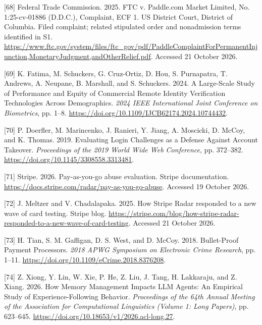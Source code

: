 \documentclass[acmlarge,review,anonymous,nonacm]{acmart}
\newlength{\cslhangindent}
\newlength{\cslentryspacingunit} %
\newenvironment{CSLReferences}[2] %
 {\bibliofont %
  \setlength{\parindent}{0pt}
  \ifodd #1
  \let\oldpar\par
  \def\par{\hangindent=\cslhangindent\oldpar}
  \fi
  \setlength{\parskip}{#2\cslentryspacingunit}
 }%
 {}
\begin{document}
\begin{CSLReferences}{1}{1}
\leavevmode{}%
{[}68{]} Federal Trade Commission. 2025. FTC v. Paddle.com Market
Limited, No. 1:25-cv-01886 (D.D.C.), Complaint, ECF 1. US District
Court, District of Columbia. Filed complaint; related stipulated order
and nonadmission terms identified in S1.
\url{https://www.ftc.gov/system/files/ftc_gov/pdf/PaddleComplaintForPermanentInjunction,MonetaryJudgment,andOtherRelief.pdf}.
Accessed 21 October 2026.

\leavevmode{}%
{[}69{]} K. Fatima, M. Schuckers, G. Cruz-Ortiz, D. Hou, S. Purnapatra,
T. Andrews, A. Neupane, B. Marshall, and S. Schuckers. 2024. A
Large-Scale Study of Performance and Equity of Commercial Remote
Identity Verification Technologies Across Demographics. \emph{2024 IEEE
International Joint Conference on Biometrics}, pp. 1--8.
\url{https://doi.org/10.1109/IJCB62174.2024.10744432}.

\leavevmode{}%
{[}70{]} P. Doerfler, M. Marincenko, J. Ranieri, Y. Jiang, A. Moscicki,
D. McCoy, and K. Thomas. 2019. Evaluating Login Challenges as a Defense
Against Account Takeover. \emph{Proceedings of the 2019 World Wide Web
Conference}, pp. 372--382.
\url{https://doi.org/10.1145/3308558.3313481}.

\leavevmode{}%
{[}71{]} Stripe. 2026. Pay-as-you-go abuse evaluation. Stripe
documentation. \url{https://docs.stripe.com/radar/pay-as-you-go-abuse}.
Accessed 19 October 2026.

\leavevmode{}%
{[}72{]} J. Meltzer and V. Chadalapaka. 2025. How Stripe Radar responded
to a new wave of card testing. Stripe blog.
\url{https://stripe.com/blog/how-stripe-radar-responded-to-a-new-wave-of-card-testing}.
Accessed 21 October 2026.

\leavevmode{}%
{[}73{]} H. Tian, S. M. Gaffigan, D. S. West, and D. McCoy. 2018.
Bullet-Proof Payment Processors. \emph{2018 APWG Symposium on Electronic
Crime Research}, pp. 1--11.
\url{https://doi.org/10.1109/eCrime.2018.8376208}.

\leavevmode{}%
{[}74{]} Z. Xiong, Y. Lin, W. Xie, P. He, Z. Liu, J. Tang, H. Lakkaraju,
and Z. Xiang. 2026. How Memory Management Impacts LLM Agents: An
Empirical Study of Experience-Following Behavior. \emph{Proceedings of
the 64th Annual Meeting of the Association for Computational Linguistics
(Volume 1: Long Papers)}, pp. 623--645.
\url{https://doi.org/10.18653/v1/2026.acl-long.27}.


\end{CSLReferences}
\end{document}
